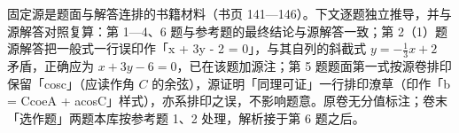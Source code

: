 

\begin{gktip}
固定源是题面与解答连排的书籍材料（书页 141—146）。下文逐题独立推导，并与源解答对照复算：第 1—4、6 题与参考题的最终结论与源解答一致；第 2（1）题源解答把一般式一行误印作「x + 3y - 2 = 0」，与其自列的斜截式 $y=-\frac13x+2$ 矛盾，正确应为 $x+3y-6=0$，已在该题加源注；第 5 题题面第一式按源卷排印保留「cosc」（应读作角 $C$ 的余弦），源证明「同理可证」一行排印潦草（印作「b = CcoeA + acosC」样式），亦系排印之误，不影响题意。原卷无分值标注；卷末「选作题」两题本库按参考题 1、2 处理，解析接于第 6 题之后。
\end{gktip}

